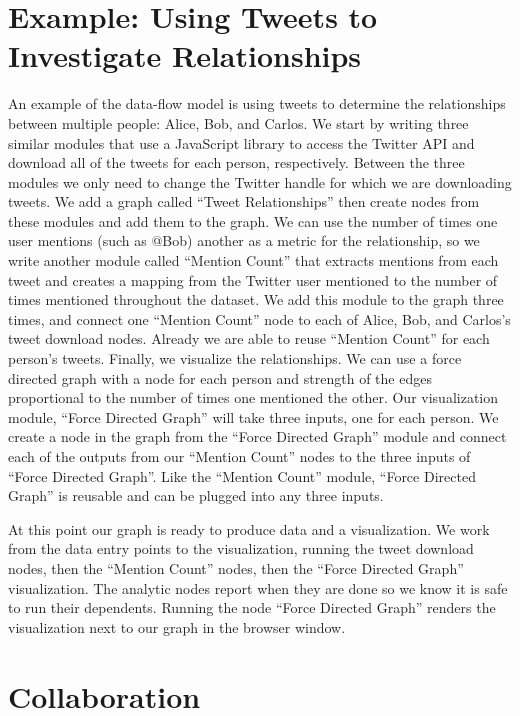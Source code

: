 \documentclass[midd]{thesis}
\begin{document}
\section{Example: Using Tweets to Investigate Relationships}

An example of the data-flow model is using tweets to determine the relationships
between multiple people: Alice, Bob, and Carlos. We start by writing three
similar modules that use a JavaScript library to access the Twitter API and
download all of the tweets for each person, respectively. Between the three
modules we only need to change the Twitter handle for which we are downloading
tweets. We add a graph called ``Tweet Relationships'' then create nodes from
these modules and add them to the graph. We can use the number of times one user
mentions (such as @Bob) another as a metric for the relationship, so we write
another module called ``Mention Count'' that extracts mentions from each tweet
and creates a mapping from the Twitter user mentioned to the number of times
mentioned throughout the dataset. We add this module to the graph three times,
and connect one ``Mention Count'' node to each of Alice, Bob, and Carlos's tweet
download nodes. Already we are able to reuse ``Mention Count'' for each person's
tweets. Finally, we visualize the relationships. We can use a force directed
graph with a node for each person and strength of the edges proportional to the
number of times one mentioned the other. Our visualization module, ``Force
Directed Graph'' will take three inputs, one for each person. We create a node
in the graph from the ``Force Directed Graph'' module and connect each of the
outputs from our ``Mention Count'' nodes to the three inputs of ``Force Directed
Graph''. Like the ``Mention Count'' module, ``Force Directed Graph'' is reusable
and can be plugged into any three inputs.

At this point our graph is ready to produce data and a visualization. We work
from the data entry points to the visualization, running the tweet download
nodes, then the ``Mention Count'' nodes, then the ``Force Directed Graph''
visualization. The analytic nodes report when they are done so we know it is
safe to run their dependents. Running the node ``Force Directed Graph'' renders
the visualization next to our graph in the browser window.

\section{Collaboration}
\end{document}
